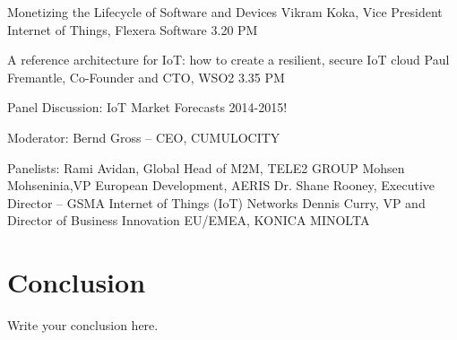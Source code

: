 \documentclass{report}
\begin{document}
Monetizing the Lifecycle of Software and Devices
Vikram Koka, Vice President Internet of Things, Flexera Software
3.20 PM
	
A reference architecture for IoT: how to create a resilient, secure IoT cloud
Paul Fremantle, Co-Founder and  CTO, WSO2
3.35 PM
	
Panel Discussion: IoT Market Forecasts 2014-2015! 
 
Moderator:
Bernd Gross – CEO, CUMULOCITY
 
Panelists:
Rami Avidan, Global Head of M2M, TELE2 GROUP
Mohsen Mohseninia,VP European Development, AERIS
Dr. Shane Rooney, Executive Director – GSMA Internet of Things (IoT) Networks
Dennis Curry, VP and  Director of Business Innovation EU/EMEA, KONICA MINOLTA



\section{Conclusion}
Write your conclusion here.
\end{document}
